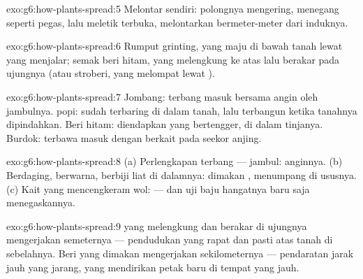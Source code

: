 \begin{solution}{exo:g6:how-plants-spread:5}
Melontar sendiri: polongnya mengering, menegang seperti pegas, lalu
meletik terbuka, melontarkan  bermeter-meter dari induknya.
\end{solution}

\begin{solution}{exo:g6:how-plants-spread:6}
Rumput grinting, yang maju di bawah tanah lewat  yang menjalar;
semak beri hitam, yang melengkung ke atas lalu berakar pada ujungnya
(atau stroberi, yang melompat lewat ).
\end{solution}

\begin{solution}{exo:g6:how-plants-spread:7}
Jombang: terbang masuk bersama angin oleh jambulnya.  popi:
 sudah terbaring di dalam tanah, lalu terbangun ketika tanahnya
dipindahkan. Beri hitam: diendapkan  yang bertengger,  di
dalam tinjanya. Burdok: terbawa masuk dengan berkait pada  seekor
anjing.
\end{solution}

\begin{solution}{exo:g6:how-plants-spread:8}
(a) Perlengkapan terbang --- jambul: anginnya. (b) Berdaging, berwarna,
berbiji  liat di dalamnya: dimakan ,  menumpang di
ususnya. (c) Kait yang mencengkeram wol:   --- dan uji baju
hangatnya baru saja menegaskannya.
\end{solution}

\begin{solution}{exo:g6:how-plants-spread:9}
 yang melengkung dan berakar di ujungnya mengerjakan semeternya
--- pendudukan yang rapat dan pasti atas tanah di sebelahnya. Beri
yang dimakan  mengerjakan sekilometernya --- pendaratan jarak
jauh yang jarang, yang mendirikan petak baru di tempat yang jauh.
\end{solution}

